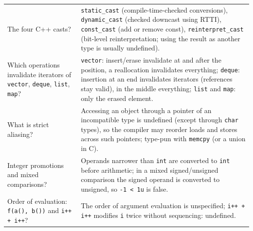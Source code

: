 \documentclass[10pt,a4paper,openany,oneside]{report}
\begin{document}
\begin{center}
\begin{xltabular}{\textwidth}{@{}L{4.6cm}Y@{}}
The four C++ casts? & \texttt{static\_cast} (compile-time-checked conversions), \texttt{dynamic\_cast} (checked downcast using RTTI), \texttt{const\_cast} (add or remove const), \texttt{reinterpret\_cast} (bit-level reinterpretation; using the result as another type is usually undefined).\\
Which operations invalidate iterators of \texttt{vector}, \texttt{deque}, \texttt{list}, \texttt{map}? & \texttt{vector}: insert/erase invalidate at and after the position, a reallocation invalidates everything; \texttt{deque}: insertion at an end invalidates iterators (references stay valid), in the middle everything; \texttt{list} and \texttt{map}: only the erased element.\\
What is strict aliasing? & Accessing an object through a pointer of an incompatible type is undefined (except through \texttt{char} types), so the compiler may reorder loads and stores across such pointers; type-pun with \texttt{memcpy} (or a union in C).\\
Integer promotions and mixed comparisons? & Operands narrower than \texttt{int} are converted to \texttt{int} before arithmetic; in a mixed signed/unsigned comparison the signed operand is converted to unsigned, so \texttt{-1 < 1u} is false.\\
Order of evaluation: \texttt{f(a(), b())} and \texttt{i++ + i++}? & The order of argument evaluation is unspecified; \texttt{i++ + i++} modifies \texttt{i} twice without sequencing: undefined.\\
\bottomrule
\end{xltabular}
\end{center}
\end{document}
